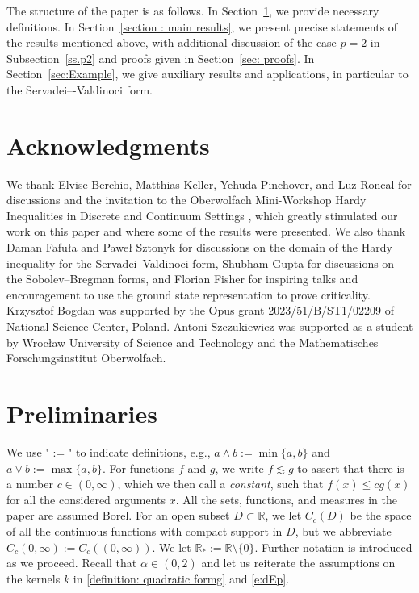 \documentclass[12pt, a4paper]{amsart}
\newcommand{\R}{\mathbb{R}}
\newcommand{\Ro}{\R_*}
\begin{document}



The structure of the paper is as follows. In Section~\cref{sec:Pre}, we provide necessary definitions. In Section~\cref{section : main results}, we present precise statements of the results mentioned above, with additional discussion of the case $p=2$ in Subsection~\cref{ss.p2} and proofs given in Section~\cref{sec: proofs}.
 In Section~\cref{sec:Example}, we give auxiliary results and applications, in particular to the Servadei–-Valdinoci form. 




\section*{Acknowledgments}
We thank Elvise Berchio, Matthias Keller, Yehuda Pinchover, and Luz Roncal for discussions and the invitation to the Oberwolfach Mini-Workshop Hardy Inequalities in Discrete and Continuum Settings \cite{OberwolfachReport2025-14}, which greatly stimulated our work on this paper and where some of the results were presented.
We also thank Daman Fafuła and Paweł Sztonyk for discussions on the domain of the Hardy inequality for the Servadei--Valdinoci form, Shubham Gupta for discussions on the Sobolev--Bregman forms, and Florian Fisher for inspiring talks and encouragement to use the ground state representation to prove criticality. Krzysztof Bogdan was  supported by the Opus grant 2023/51/B/ST1/02209 of National Science Center, Poland. Antoni Szczukiewicz was supported as a student by Wrocław University of Science and Technology and the Mathematisches Forschungsinstitut Oberwolfach.

\section{Preliminaries}
\label{sec:Pre}

We use "$:=$" to indicate definitions, e.g.,
$a \wedge b := \min \{ a, b\}$ and $a \vee b := \max \{ a, b\}$.
For functions $f$ and $g$, we write $f\lesssim g$ to assert that there is a number $c\in (0,\infty)$, which we then call a \textit{constant}, such that $f(x)\leq c g(x)$ for all the considered arguments $x$. All the sets, functions, and measures in the paper are assumed Borel. 
For an open subset $D\subset \mathbb R$, we let $C_c(D)$ be the space of all the continuous functions with compact support in $D$, but we abbreviate $C_c(0, \infty):=C_c((0, \infty))$. We let $\Ro := \R \setminus\{0\}$. Further notation is introduced as we proceed. Recall that $\alpha \in (0, 2)$ and let us reiterate the assumptions on the kernels $k$ in \eqref{definition: quadratic formg} and \eqref{e:dEp}.
\end{document}
